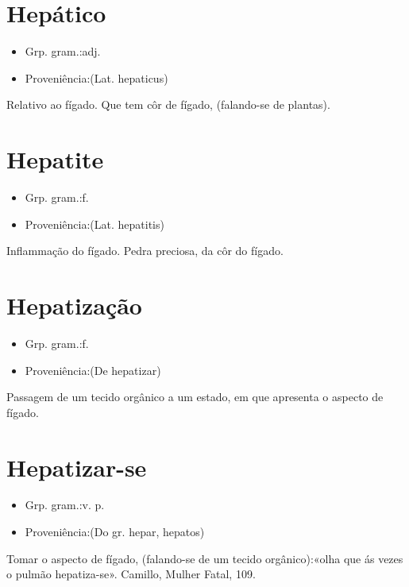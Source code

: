 \documentclass{article}
\begin{document}
\section{Hepático}
\begin{itemize}
\item {Grp. gram.:adj.}
\end{itemize}
\begin{itemize}
\item {Proveniência:(Lat. \textunderscore hepaticus\textunderscore )}
\end{itemize}
Relativo ao fígado.
Que tem côr de fígado, (falando-se de plantas).
\section{Hepatite}
\begin{itemize}
\item {Grp. gram.:f.}
\end{itemize}
\begin{itemize}
\item {Proveniência:(Lat. \textunderscore hepatitis\textunderscore )}
\end{itemize}
Inflammação do fígado.
Pedra preciosa, da côr do fígado.
\section{Hepatização}
\begin{itemize}
\item {Grp. gram.:f.}
\end{itemize}
\begin{itemize}
\item {Proveniência:(De \textunderscore hepatizar\textunderscore )}
\end{itemize}
Passagem de um tecido orgânico a um estado, em que apresenta o aspecto de fígado.
\section{Hepatizar-se}
\begin{itemize}
\item {Grp. gram.:v. p.}
\end{itemize}
\begin{itemize}
\item {Proveniência:(Do gr. \textunderscore hepar\textunderscore , \textunderscore hepatos\textunderscore )}
\end{itemize}
Tomar o aspecto de fígado, (falando-se de um tecido orgânico):«\textunderscore olha que ás vezes o pulmão hepatiza-se\textunderscore ». Camillo, \textunderscore Mulher Fatal\textunderscore , 109.
\end{document}
